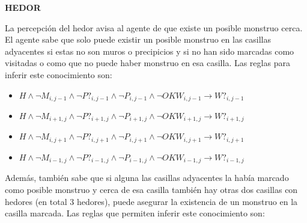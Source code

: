 \centerline{\textbf{HEDOR}}

La percepción del hedor avisa al agente de que existe un posible monstruo cerca. El agente sabe que solo puede existir un posible monstruo en las casillas adyacentes si estas no son muros o precipicios y si no han sido marcadas como visitadas o como que no puede haber monstruo en esa casilla. Las reglas para inferir este conocimiento son:

\begin{itemize}
    \item $H \land \neg M_{i, j-1} \land \neg P?_{i, j-1} \land \neg P_{i, j-1} \land \neg OKW_{i, j-1} \longrightarrow W?_{i, j-1}$
    \item $H \land \neg M_{i+1, j} \land \neg P?_{i+1, j} \land \neg P_{i+1, j} \land \neg OKW_{i+1, j} \longrightarrow W?_{i+1, j}$
    \item $H \land \neg M_{i, j+1} \land \neg P?_{i, j+1} \land \neg P_{i, j+1} \land \neg OKW_{i, j+1} \longrightarrow W?_{i, j+1}$
    \item $H \land \neg M_{i-1, j} \land \neg P?_{i-1, j} \land \neg P_{i-1, j} \land \neg OKW_{i-1, j} \longrightarrow W?_{i-1, j}$
\end{itemize}


Además, también sabe que si alguna las casillas adyacentes la había marcado como posible monstruo y cerca de esa casilla también hay otras dos casillas con hedores (en total 3 hedores), puede asegurar la existencia de un monstruo en la casilla marcada. Las reglas que permiten inferir este conocimiento son:

